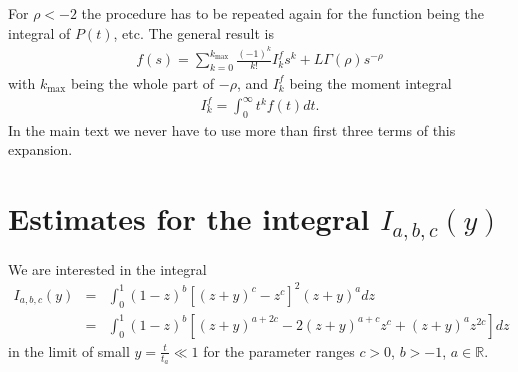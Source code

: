 For $\rho < -2$ the procedure has to be repeated again for the function being the integral of $P(t)$, etc. The general result is
%
\begin{align}
 f(s) = \sum_{k=0}^{k_{\max}} \frac{(-1)^k}{k!} I^{f}_k s^k + L \Gamma(\rho) s^{-\rho}
\end{align}
%
with $k_{\max}$ being the whole part of $-\rho$, and $I^{f}_k$ being the moment integral
\begin{align}
I^{f}_k = \int_0^\infty t^k f(t) dt.
\end{align}
In the main text we never have to use more than first three terms of this expansion. 


\chapter*{Estimates for the integral $I_{a,b,c}(y)$ \label{sec:integral}} 

We are interested in the integral 
%
\begin{eqnarray}
I_{a,b,c}(y) &=& \int^{1}_0 (1-z)^{b} [(z+y)^c-z^c]^2 (z+y)^{a}  dz \label{eqn:Iabc1} \\ 
&=& \int^{1}_0 (1-z)^{b} \left[ (z+y)^{a+2c} -2 (z+y)^{a+c} z^{c}  + (z+y)^{a} z^{2c}\right] dz \nonumber 
\end{eqnarray}
%
in the limit of small $y= \frac{t}{t_a} \ll 1$ for the parameter ranges $c > 0$, $b > -1$, $a \in \mathbb{R}$.

